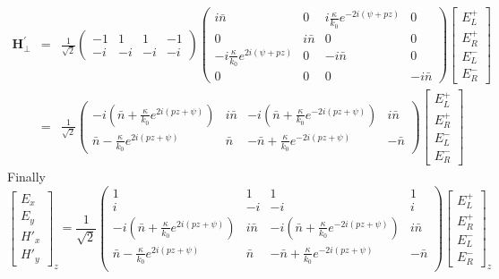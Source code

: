 \begin{eqnarray}
\mathbf{H_\perp^\prime} &=& \frac{1}{\sqrt{2}}\begin{pmatrix}-1 & 1 & 1 & -1\\-i & -i & -i & -i\end{pmatrix}\begin{pmatrix}
i\bar{n} & 0 & i\frac{\kappa}{k_0} e^{-2i(\psi+pz)} & 0\\
0 & i\bar{n} & 0 & 0\\
-i\frac{\kappa}{k_0}e^{2i(\psi + pz)} & 0 & -i\bar{n} & 0\\
0 & 0 & 0 & -i\bar{n}
\end{pmatrix}\begin{bmatrix}
E_L^+\\E_R^+\\E_L^-\\E_R^-
\end{bmatrix}\\
&=&\frac{1}{\sqrt{2}}\begin{pmatrix}
-i \left(\bar{n} + \frac{\kappa}{k_0} e^{2 i \left(p z + \psi\right)}\right)&  i \bar{n} & -i \left(\bar{n} + \frac{\kappa}{k_0} e^{-2 i \left(p z + \psi\right)}\right)& i \bar{n}\\
\bar{n} - \frac{\kappa}{k_0} e^{2 i \left(p z + \psi\right)}&\bar{n}&-\bar{n} + \frac{\kappa}{k_0} e^{-2 i \left(p z + \psi\right)}&- \bar{n}
\end{pmatrix}\begin{bmatrix}
E_L^+\\E_R^+\\E_L^-\\E_R^-
\end{bmatrix}
\end{eqnarray}
Finally
\begin{equation}
\begin{bmatrix}
E_x\\E_y\\H'_x\\H'_y
\end{bmatrix}_z = \frac{1}{\sqrt{2}}\begin{pmatrix}
	1 & 1 & 1 & 1\\
	i &-i &-i & i\\
	-i \left(\bar{n} + \frac{\kappa}{k_0} e^{2 i \left(p z + \psi\right)}\right)&  i \bar{n} & -i \left(\bar{n} + \frac{\kappa}{k_0} e^{-2 i \left(p z + \psi\right)}\right)& i \bar{n}\\
	\bar{n} - \frac{\kappa}{k_0} e^{2 i \left(p z + \psi\right)}&\bar{n}&-\bar{n} + \frac{\kappa}{k_0} e^{-2 i \left(p z + \psi\right)}&- \bar{n}\\
\end{pmatrix}\begin{bmatrix}
E_L^+\\E_R^+\\E_L^-\\E_R^-
\end{bmatrix}_z \label{eq:cwt_change_basis_lh}
\end{equation}	

